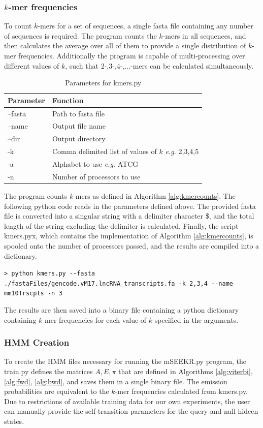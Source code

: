 \subsubsection{$k$-mer frequencies}
To count $k$-mers for a set of sequences, a single fasta file containing any number of sequences is required. The program counts the $k$-mers in all sequences, and then calculates the average over all of them to provide a single distribution of $k$-mer frequencies. Additionally the program is capable of multi-processing over different values of $k$, such that 2-,3-,4-,$\dots$-mers can be calculated simultaneously. 
\begin{table}[h]
\centering
 \begin{tabular}{|l l|}
 \hline
 Parameter & Function\\
 \hline
 --fasta & Path to fasta file \\
 --name & Output file name \\
 --dir & Output directory \\
 -k & Comma delimited list of values of $k$ \emph{e.g.} 2,3,4,5\\
 -a & Alphabet to use \emph{e.g.} ATCG\\
 -n & Number of processors to use\\
 \hline
 
\end{tabular}
\caption{Parameters for kmers.py}
\label{tab:kmerparams}
\end{table}

The program counts $k$-mers as defined in Algorithm \ref{alg:kmercounts}. The following python code reads in the parameters defined above. The provided fasta file is converted into a singular string with a delimiter character \$, and the total length of the string excluding the delimiter is calculated. Finally, the script kmers.pyx, which contains the implementation of Algorithm \ref{alg:kmercounts}, is spooled onto the number of processors passed, and the results are compiled into a dictionary. 

\lstinline{> python kmers.py --fasta ./fastaFiles/gencode.vM17.lncRNA_transcripts.fa -k 2,3,4 --name mm10Trscpts -n 3}

The results are then saved into a binary file containing a python dictionary containing $k$-mer frequencies for each value of $k$ specified in the arguments. 

\subsubsection{HMM Creation}
To create the HMM files necessary for running the mSEEKR.py program, the train.py defines the matrices $A,E,\pi$ that are defined in Algorithms \ref{alg:viterbi}, \ref{alg:fwd}, \ref{alg:bwd}, and saves them in a single binary file. The emission probabilities are equivalent to the $k$-mer frequencies calculated from kmers.py. Due to restrictions of available training data for our own experiments, the user can manually provide the self-transition parameters for the query and null hideen states.

